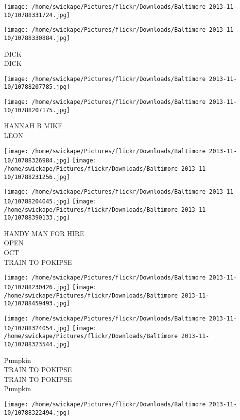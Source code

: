 \documentclass[10pt,letterpaper]{article}
\begin{document}
\texttt{[image: /home/swickape/Pictures/flickr/Downloads/Baltimore 2013-11-10/10788331724.jpg]}

\vspace{0.25in}
\texttt{[image: /home/swickape/Pictures/flickr/Downloads/Baltimore 2013-11-10/10788330884.jpg]}

DICK\\
DICK
\pagebreak

\texttt{[image: /home/swickape/Pictures/flickr/Downloads/Baltimore 2013-11-10/10788207785.jpg]}

\vspace{0.25in}
\texttt{[image: /home/swickape/Pictures/flickr/Downloads/Baltimore 2013-11-10/10788207175.jpg]}

HANNAH B MIKE\\
LEON
\pagebreak

\texttt{[image: /home/swickape/Pictures/flickr/Downloads/Baltimore 2013-11-10/10788326984.jpg]}
\texttt{[image: /home/swickape/Pictures/flickr/Downloads/Baltimore 2013-11-10/10788231256.jpg]}

\texttt{[image: /home/swickape/Pictures/flickr/Downloads/Baltimore 2013-11-10/10788204045.jpg]}
\texttt{[image: /home/swickape/Pictures/flickr/Downloads/Baltimore 2013-11-10/10788390133.jpg]}

HANDY MAN FOR HIRE\\
OPEN\\
OCT\\
TRAIN TO POKIPSE
\pagebreak

\texttt{[image: /home/swickape/Pictures/flickr/Downloads/Baltimore 2013-11-10/10788230426.jpg]}
\texttt{[image: /home/swickape/Pictures/flickr/Downloads/Baltimore 2013-11-10/10788459493.jpg]}

\texttt{[image: /home/swickape/Pictures/flickr/Downloads/Baltimore 2013-11-10/10788324054.jpg]}
\texttt{[image: /home/swickape/Pictures/flickr/Downloads/Baltimore 2013-11-10/10788323544.jpg]}

Pumpkin\\
TRAIN TO POKIPSE\\
TRAIN TO POKIPSE\\
Pumpkin
\pagebreak

\texttt{[image: /home/swickape/Pictures/flickr/Downloads/Baltimore 2013-11-10/10788322494.jpg]}
\end{document}
